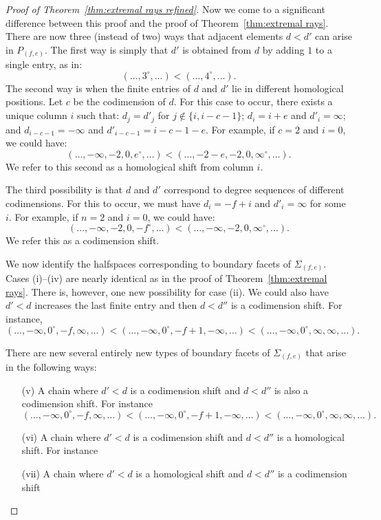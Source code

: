 \documentclass[12pt]{amsart}
\theoremstyle{definition}
\theoremstyle{remark}
\newcommand{\defi}[1]{\textsf{#1}} %
\begin{document}
\begin{proof}[Proof of Theorem~\ref{thm:extremal rays refined}]
Now we come to a significant difference between this proof and the proof of Theorem~\ref{thm:extremal rays}.  There are now three (instead of two) ways that  adjacent elements $d<d'$ can arise in $P_{(f,e)}$.   The first way is simply that $d'$ is obtained from $d$ by adding $1$ to a single entry, as in:
\[
(\dots,3^\circ,\dots)<(\dots,4^\circ,\dots).
\]
The second way is when the finite entries of $d$ and $d'$ lie in different homological positions.  Let $c$ be the codimension of $d$.  For this case to occur, there exists a unique column $i$ such that: $d_j=d'_j$ for $j\notin \{i, i-c-1\}$; $d_i=i+e$ and $d'_i=\infty$; and $d_{i-c-1}=-\infty$ and $d'_{i-c-1}=i-c-1-e$.  For example, if $c=2$ and $i=0$, we could have:
\[
(\dots, -\infty, -2, 0, e^\circ, \dots)<(\dots, -2-e,-2, 0, \infty^\circ, \dots).
\]
We refer to this second as a \defi{homological shift from column $i$}.

The third possibility is that $d$ and $d'$ correspond to degree sequences of different codimensions.  For this to occur, we must have $d_{i}=-f+i$ and $d'_i=\infty$ for some $i$.  
For example, if $n=2$ and $i=0$, we could have:
\[
(\dots, -\infty, -2, 0, -f^\circ, \dots)<(\dots, -\infty,-2, 0, \infty^\circ, \dots).
\]
We refer this as a \defi{codimension shift}.  


We now identify the halfspaces corresponding to boundary facets of $\Sigma_{(f,e)}$.  Cases (i)--(iv) are nearly identical as in the proof of Theorem~\ref{thm:extremal rays}.  There is, however, one new possibility for case (ii).  We could also have $d'<d$ increases the last finite entry and then $d<d''$ is a codimension shift.  For instance,
\[
(\dots,-\infty,0^\circ,-f,\infty,\dots)<(\dots,-\infty,0^\circ,-f+1,-\infty,\dots)<(\dots,-\infty,0^\circ,\infty,\infty,\dots).
\]

There are new several entirely new types of boundary facets of $\Sigma_{(f,e)}$ that arise in the following ways:
\begin{enumerate}
	\item[(v)] A chain where $d'<d$ is a codimension shift and $d<d''$ is also a codimension shift.  
For instance
\[
(\dots,-\infty,0^\circ,-f,\infty,\dots)<(\dots,-\infty,0^\circ,-f+1,-\infty,\dots)<(\dots,-\infty,0^\circ,\infty,\infty,\dots).
\]
	\item[(vi)]   A chain where $d'<d$ is a codimension shift and $d<d''$ is a homological shift.  For  instance
	\item[(vii)]   A chain where $d'<d$ is a homological shift and $d<d''$ is a codimension shift
\end{enumerate} 


\end{proof}
\end{document}
